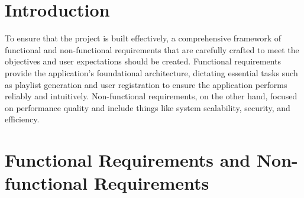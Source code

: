 \section{Introduction}
To ensure that the project is built effectively, a comprehensive framework of functional and non-functional requirements that are carefully crafted to meet the objectives and user expectations should be created.
Functional requirements provide the application's foundational architecture, dictating essential tasks such as playlist generation and user registration to ensure the application performs reliably and intuitively.
Non-functional requirements, on the other hand, focused on performance quality and include things like system scalability, security, and efficiency.
\section{Functional Requirements and Non-functional Requirements}
